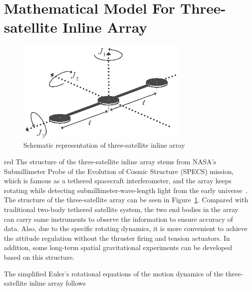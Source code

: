\section{Mathematical Model For Three-satellite Inline Array}\label{sec:mm}
\begin{figure}
\centering
\includegraphics[width=0.75\textwidth]{paper2_Fig1.eps}
\caption{Schematic representation of three-satellite inline array}
\label{Figure:3satellite}
\end{figure}
\begin{color}{red} The structure of the three-satellite inline array stems from NASA's Submillimeter Probe of the Evolution of Cosmic Structure (SPECS) mission, which is famous as a tethered spacecraft interferometer, and the array keeps rotating while detecting submillimeter-wave-length light from the early universe~\cite{lorenzini2006far}. The structure of the three-satellite array can be seen in Figure~\ref{Figure:3satellite}. Compared with traditional two-body tethered satellite system, the two end bodies in the array can carry same instruments to observe the information to ensure accuracy of data. Also, due to the specific rotating dynamics, it is more convenient to achieve the attitude regulation without the thruster firing and tension actuators. In addition, some long-term spatial gravitational experiments can be developed based on this structure.\end{color}\par
The simplified Euler's rotational equations of the motion dynamics of the three-satellite inline array follows
